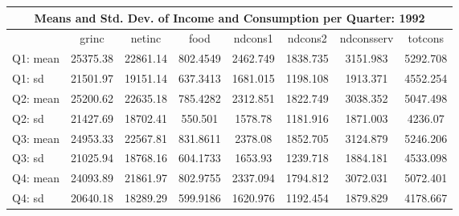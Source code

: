 \begin{tabular}{l*{7}{c}}
\hline\hline
\multicolumn{8}{c}{Means and Std. Dev. of Income and Consumption per Quarter: 1992}  \\
\hline    
            &       grinc&      netinc&        food&     ndcons1&     ndcons2&  ndconsserv&     totcons\\
\hline
Q1: mean     &    25375.38&    22861.14&    802.4549&    2462.749&    1838.735&    3151.983&    5292.708\\
Q1: sd   &    21501.97&    19151.14&    637.3413&    1681.015&    1198.108&    1913.371&    4552.254\\
Q2: mean     &    25200.62&    22635.18&    785.4282&    2312.851&    1822.749&    3038.352&    5047.498\\
Q2: sd     &    21427.69&    18702.41&     550.501&     1578.78&    1181.916&    1871.003&     4236.07\\
Q3: mean     &    24953.33&    22567.81&    831.8611&     2378.08&    1852.705&    3124.879&    5246.206\\
Q3: sd     &    21025.94&    18768.16&    604.1733&     1653.93&    1239.718&    1884.181&    4533.098\\
Q4: mean    &    24093.89&    21861.97&    802.9755&    2337.094&    1794.812&    3072.031&    5072.401\\
Q4: sd  &    20640.18&    18289.29&    599.9186&    1620.976&    1192.454&    1879.829&    4178.667\\
\hline\hline
\end{tabular}
